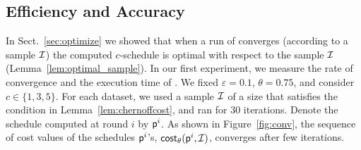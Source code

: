 \subsection{Efficiency and Accuracy}
In Sect.~\ref{sec:optimize} we showed that when a run of \algonameapx converges
(according to a sample $\mathcal{I}$) the computed $c$-schedule is optimal with
respect to the sample $\mathcal{I}$ (Lemma~\ref{lem:optimal_sample}). In our first
experiment, we measure the rate of convergence and the execution time of
\algonameapx. We fixed $\varepsilon=0.1$, $\theta=0.75$, and consider
$c\in\{1,3,5\}$. For each dataset, we used a sample $\mathcal{I}$ of a size that
satisfies the condition in Lemma~\ref{lem:chernoffcost}, and ran \algonameapx
for 30 iterations. Denote the schedule computed at round $i$ by $\mathsf{p}^i$.
As shown in Figure~\ref{fig:conv}, the sequence of cost values of the schedules
$\mathsf{p}^i$'s, $\mathsf{cost}_\theta(\mathsf{p}^i,\mathcal{I})$, converges after few iterations.


%
%
%
%
%
%




